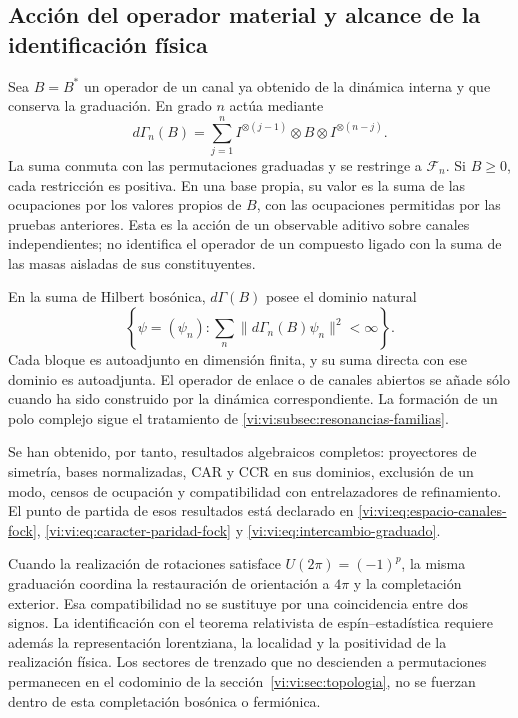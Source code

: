 \subsection{Acción del operador material y alcance de la identificación física}
\label{vi:vi:subsec:fock-alcance}

Sea \(B=B^*\) un operador de un canal ya obtenido de la
dinámica interna y que conserva la graduación. En grado \(n\)
actúa mediante
\[
 d\Gamma_n(B)=\sum_{j=1}^n
 I^{\otimes(j-1)}\otimes B\otimes I^{\otimes(n-j)}.
\]
La suma conmuta con las permutaciones graduadas y se restringe
a \(\mathcal F_n\). Si \(B\ge0\), cada restricción es positiva.
En una base propia, su valor es la suma de las ocupaciones
por los valores propios de \(B\), con las ocupaciones
permitidas por las pruebas anteriores. Esta es la acción
de un observable aditivo sobre canales independientes;
no identifica el operador de un compuesto ligado con la
suma de las masas aisladas de sus constituyentes.

En la suma de Hilbert bosónica, \(d\Gamma(B)\) posee el
dominio natural
\[
 \left\{\psi=(\psi_n):
 \sum_n\|d\Gamma_n(B)\psi_n\|^2<\infty\right\}.
\]
Cada bloque es autoadjunto en dimensión finita, y su suma
directa con ese dominio es autoadjunta. El operador de enlace
o de canales abiertos se añade sólo cuando ha sido construido
por la dinámica correspondiente. La formación de un polo
complejo sigue el tratamiento de
\ref{vi:vi:subsec:resonancias-familias}.

Se han obtenido, por tanto, resultados algebraicos completos:
proyectores de simetría, bases normalizadas, CAR y CCR en
sus dominios, exclusión de un modo, censos de ocupación y
compatibilidad con entrelazadores de refinamiento. El punto
de partida de esos resultados está declarado en
\eqref{vi:vi:eq:espacio-canales-fock},
\eqref{vi:vi:eq:caracter-paridad-fock} y
\eqref{vi:vi:eq:intercambio-graduado}.

Cuando la realización de rotaciones satisface
\(U(2\pi)=(-1)^p\), la misma graduación coordina la
restauración de orientación a \(4\pi\) y la completación
exterior. Esa compatibilidad no se sustituye por una
coincidencia entre dos signos. La identificación con el
teorema relativista de espín--estadística requiere además
la representación lorentziana, la localidad y la positividad
de la realización física. Los sectores de trenzado que no
descienden a permutaciones permanecen en el codominio de
la sección~\ref{vi:vi:sec:topologia}, no se fuerzan dentro
de esta completación bosónica o fermiónica.
